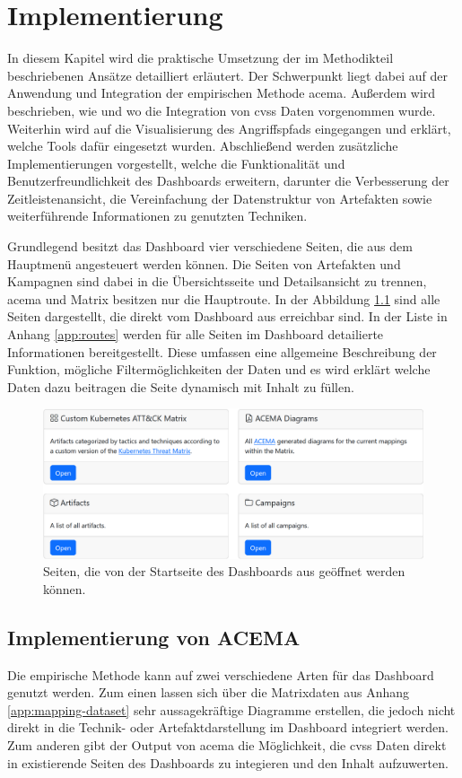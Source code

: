 \chapter{Implementierung}
\label{chap:implementierung}
In diesem Kapitel wird die praktische Umsetzung der im Methodikteil beschriebenen Ansätze detailliert erläutert. Der Schwerpunkt liegt dabei auf der Anwendung und Integration der empirischen Methode \gls{acema}. Außerdem wird beschrieben, wie und wo die Integration von \gls{cvss} Daten vorgenommen wurde. Weiterhin wird auf die Visualisierung des Angriffspfads eingegangen und erklärt, welche Tools dafür eingesetzt wurden. Abschließend werden zusätzliche Implementierungen vorgestellt, welche die Funktionalität und Benutzerfreundlichkeit des Dashboards erweitern, darunter die Verbesserung der Zeitleistenansicht, die Vereinfachung der Datenstruktur von Artefakten sowie weiterführende Informationen zu genutzten Techniken.
\par Grundlegend besitzt das Dashboard vier verschiedene Seiten, die aus dem Hauptmenü angesteuert werden können. Die Seiten von Artefakten und Kampagnen sind dabei in die Übersichtsseite und Detailsansicht zu trennen, \gls{acema} und Matrix besitzen nur die Hauptroute. In der Abbildung \ref{fig:home} sind alle Seiten dargestellt, die direkt vom Dashboard aus erreichbar sind. In der Liste in Anhang \ref{app:routes} werden für alle Seiten im Dashboard detailierte Informationen bereitgestellt. Diese umfassen eine allgemeine Beschreibung der Funktion, mögliche Filtermöglichkeiten der Daten und es wird erklärt welche Daten dazu beitragen die Seite dynamisch mit Inhalt zu füllen.

\begin{figure}[!htb]
    \centering
    \includegraphics[width=1\textwidth]{images/home.png}
    \caption{Seiten, die von der Startseite des Dashboards aus geöffnet werden können.}
    \label{fig:home}
\end{figure}

\section{Implementierung von ACEMA}
Die empirische Methode kann auf zwei verschiedene Arten für das Dashboard genutzt werden. Zum einen lassen sich über die Matrixdaten aus Anhang \ref{app:mapping-dataset} sehr aussagekräftige Diagramme erstellen, die jedoch nicht direkt in die Technik- oder Artefaktdarstellung im Dashboard integriert werden. Zum anderen gibt der Output von \gls{acema} die Möglichkeit, die \gls{cvss} Daten direkt in existierende Seiten des Dashboards zu integieren und den Inhalt aufzuwerten.

